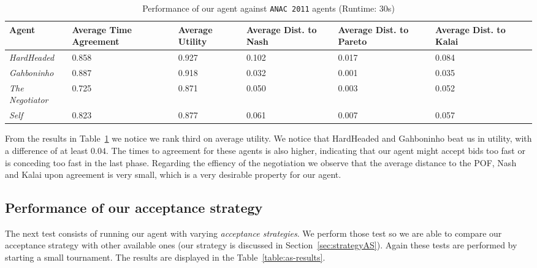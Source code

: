 \begin{table}[H]
	\centering
	\small
    \begin{tabular}{m{2cm}m{2cm}m{2cm}m{2cm}m{2cm}m{2cm}m{2cm}}
    \toprule
    Agent                       & Average Time Agreement & Average Utility & Average Dist. to Nash & Average Dist. to Pareto & Average Dist. to Kalai \\
    \midrule
    \emph{HardHeaded}		& 0.858  & 0.927  & 0.102  & 0.017  & 0.084   \\ 
    \emph{Gahboninho}   	& 0.887  & 0.918  & 0.032  & 0.001  & 0.035   \\ 
    \emph{The Negotiator} 	& 0.725  & 0.871  & 0.050  & 0.003  & 0.052   \\ 
    \emph{Self}                 & 0.823  & 0.877  & 0.061  & 0.007  & 0.057   \\
    \bottomrule
    \end{tabular}
    \caption{Performance of our agent against \texttt{ANAC 2011} agents (Runtime: $30$s) \label{table:anac2011-results}}
\end{table}

From the results in Table~\ref{table:anac2011-results} we notice we rank third on average utility. 
We notice that HardHeaded and Gahboninho beat us in utility, with a difference of at least $0.04$. The times to agreement for these agents is also higher,
indicating that our agent might accept bids too fast or is conceding too fast in the last phase.
Regarding the effiency of the negotiation we observe that the average distance to the POF, Nash and Kalai upon agreement is very small,
which is a very desirable property for our agent. 

\subsection{Performance of our acceptance strategy}

The next test consists of running our agent with varying \emph{acceptance strategies}. We perform those test so we are able to compare our acceptance strategy with other available ones (our strategy is discussed in Section~\ref{sec:strategyAS}). Again these tests are performed by starting a small tournament. The results are displayed in the Table~\ref{table:as-results}. 

